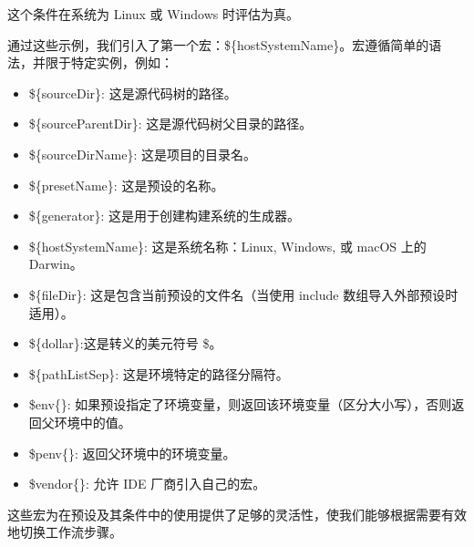 这个条件在系统为 Linux 或 Windows 时评估为真。

通过这些示例，我们引入了第一个宏：\$\{hostSystemName\}。宏遵循简单的语法，并限于特定实例，例如：

\begin{itemize}
\item
\$\{sourceDir\}: 这是源代码树的路径。

\item
\$\{sourceParentDir\}: 这是源代码树父目录的路径。

\item
\$\{sourceDirName\}: 这是项目的目录名。

\item
\$\{presetName\}: 这是预设的名称。

\item
\$\{generator\}: 这是用于创建构建系统的生成器。

\item
\$\{hostSystemName\}: 这是系统名称：Linux, Windows, 或 macOS 上的 Darwin。

\item
\$\{fileDir\}: 这是包含当前预设的文件名（当使用 include 数组导入外部预设时适用）。

\item
\$\{dollar\}:这是转义的美元符号 \$。

\item
\$\{pathListSep\}: 这是环境特定的路径分隔符。

\item
\$env\{<variable-name>\}: 如果预设指定了环境变量，则返回该环境变量（区分大小写），否则返回父环境中的值。

\item
\$penv\{<variable-name>\}: 返回父环境中的环境变量。

\item
\$vendor\{<macro-name>\}: 允许 IDE 厂商引入自己的宏。
\end{itemize}

这些宏为在预设及其条件中的使用提供了足够的灵活性，使我们能够根据需要有效地切换工作流步骤。


























